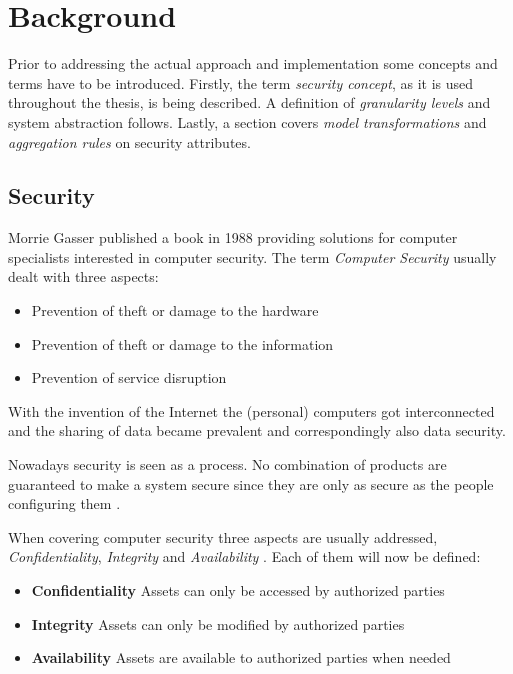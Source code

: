 
\newpage
\section{Background}
\label{sec:background}
Prior to addressing the actual approach and implementation some concepts and terms have to be introduced. Firstly, the term \textit{security concept}, as it is used throughout the thesis, is being described. A definition of \textit{granularity levels} and system abstraction follows. Lastly, a section covers \textit{model transformations} and \textit{aggregation rules} on security attributes.

\subsection{Security}

Morrie Gasser \cite{Gasser} published a book in 1988 providing solutions for computer specialists interested in computer security. The term \textit{Computer Security} usually dealt with three aspects:

\begin{itemize}
\item Prevention of theft or damage to the hardware 
\item Prevention of theft or damage to the information
\item Prevention of service disruption
\end{itemize}

With the invention of the Internet the (personal) computers got interconnected and the sharing of data became prevalent and correspondingly also data security.

Nowadays security is seen as a process. No combination of products are guaranteed to make a system secure since they are only as secure as the people configuring them \cite{vacca2012computer}. \label{sec:security}

When covering computer security three aspects are usually addressed, \textit{Confidentiality}, \textit{Integrity} and \textit{Availability} \cite{Pfleeger:2006:SC:1177321}. Each of them will now be defined:

\begin{itemize}
\item[] \textbf{Confidentiality} Assets can only be accessed by authorized parties
\item[] \textbf{Integrity} Assets can only be modified by authorized parties
\item[] \textbf{Availability} Assets are available to authorized parties when needed
\end{itemize} 

